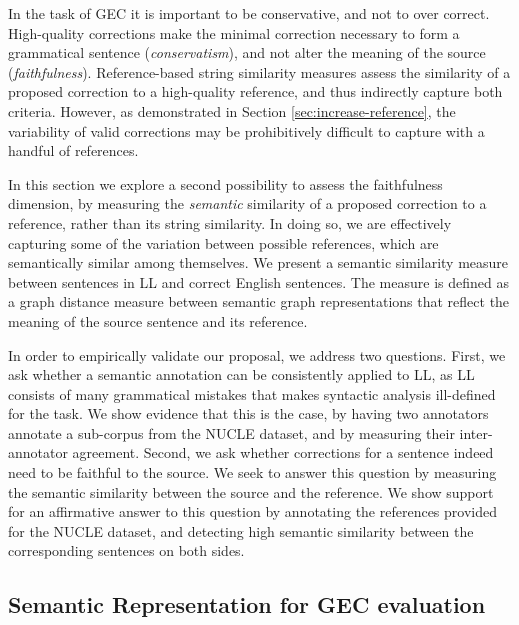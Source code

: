\documentclass[letter,11pt]{article}
\begin{document}
In the task of GEC it is important to be
conservative, and not to over correct. High-quality corrections make the minimal correction
necessary to form a grammatical sentence (\textit{conservatism}), and not alter the
meaning of the source (\textit{faithfulness}). Reference-based string similarity measures
assess the similarity of a proposed correction to a high-quality reference, 
and thus indirectly capture both criteria. However, as demonstrated in Section \ref{sec:increase-reference},
the variability of valid corrections may be prohibitively difficult
to capture with a handful of references.

In this section we explore a second possibility to assess the faithfulness dimension, by
measuring the {\it semantic} similarity of a proposed correction to a reference, rather
than its string similarity. In doing so, we are effectively capturing some of the variation
between possible references, which are semantically similar among themselves.
We present a semantic similarity measure between sentences in LL and
correct English sentences. The measure is defined as a graph distance measure between
semantic graph representations that reflect the meaning of the source sentence and its reference. 

In order to empirically validate our proposal, we address two
questions. First, we ask whether a semantic annotation can be consistently
applied to LL, as LL consists of many grammatical mistakes that makes syntactic analysis ill-defined for the task. We show evidence that this is the case, by having two annotators annotate a sub-corpus from the NUCLE dataset, and by measuring their inter-annotator agreement.
Second, we ask whether corrections for a sentence indeed need to be faithful to the source. We seek to answer this question by measuring
the semantic similarity between the source and the reference. We show support for an affirmative answer to this question 
by annotating the references provided for the NUCLE dataset,
and detecting high semantic similarity between the corresponding sentences on both sides. 

\subsection{Semantic Representation for GEC evaluation}
\end{document}
